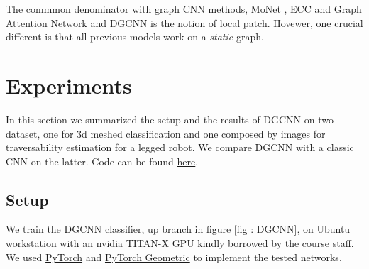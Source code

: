 \documentclass[twocolumn,showpacs,
  nofootinbib,aps,superscriptaddress,
  eqsecnum,prd,notitlepage,showkeys,10pt]{revtex4-1}
\begin{document}
The commmon denominator with graph CNN methods, MoNet \cite{monet}, ECC \cite{ecc} and Graph Attention Network \cite{gat} and DGCNN is the notion of local patch. Hovewer, one crucial different is that all previous models work on a \emph{static} graph.


\section{Experiments}
In this section we summarized the setup and the results of DGCNN on two dataset, one for 3d meshed classification and one composed by images for traversability estimation for a legged robot. We compare DGCNN with a classic CNN on the latter. Code can be found \href{https://github.com/FrancescoSaverioZuppichini/GDL-project}{here}.
\subsection{Setup}
We train the DGCNN classifier, up branch in figure \ref{fig : DGCNN}, on Ubuntu workstation with an nvidia TITAN-X GPU kindly borrowed by the course staff. We used \href{https://pytorch.org/}{PyTorch} and \href{https://rusty1s.github.io/pytorch_geometric/build/html/index.html}{PyTorch Geometric} \cite{torch_geometric} to implement the tested networks. 
\end{document}
